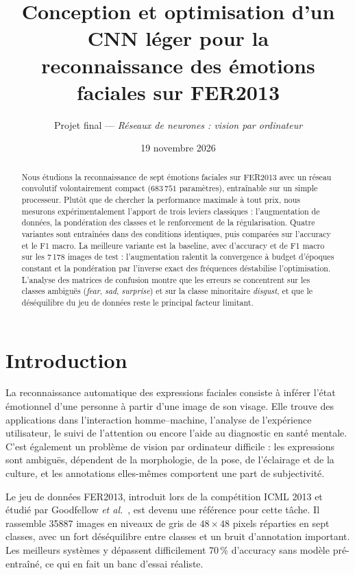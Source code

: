 \documentclass[11pt,a4paper]{article}
\title{\vspace{-1.2cm}\textbf{Conception et optimisation d'un CNN léger pour la\\reconnaissance des émotions faciales sur FER2013}}
\author{Projet final --- \emph{Réseaux de neurones : vision par ordinateur}}
\date{19 novembre 2026}
\newcommand{\NumParams}{683\,751}
\newcommand{\TestSize}{7\,178}
\begin{document}


\maketitle
\vspace{-0.8cm}

\begin{abstract}
\noindent
Nous étudions la reconnaissance de sept émotions faciales sur FER2013 avec un
réseau convolutif volontairement compact ($\NumParams$ paramètres), entraînable
sur un simple processeur. Plutôt que de chercher la performance maximale à tout
prix, nous mesurons expérimentalement l'apport de trois leviers classiques :
l'augmentation de données, la pondération des classes et le renforcement de la
régularisation. Quatre variantes sont entraînées dans des conditions
identiques, puis comparées sur l'accuracy et le F1 macro. La meilleure variante
est la baseline, avec \BestAcc{} d'accuracy et \BestF{} de F1 macro sur les
\TestSize{} images de test : l'augmentation ralentit la convergence à budget
d'époques constant et la pondération par l'inverse exact des fréquences
déstabilise l'optimisation. L'analyse des matrices de confusion montre que les
erreurs se concentrent sur les classes ambiguës (\emph{fear}, \emph{sad},
\emph{surprise}) et sur la classe minoritaire \emph{disgust}, et que le
déséquilibre du jeu de données reste le principal facteur limitant.
\end{abstract}

\section{Introduction}

La reconnaissance automatique des expressions faciales consiste à inférer
l'état émotionnel d'une personne à partir d'une image de son visage. Elle
trouve des applications dans l'interaction homme--machine, l'analyse de
l'expérience utilisateur, le suivi de l'attention ou encore l'aide au
diagnostic en santé mentale. C'est également un problème de vision par
ordinateur difficile : les expressions sont ambiguës, dépendent de la
morphologie, de la pose, de l'éclairage et de la culture, et les annotations
elles-mêmes comportent une part de subjectivité.

Le jeu de données FER2013, introduit lors de la compétition ICML 2013 et
étudié par Goodfellow \emph{et al.}~\cite{goodfellow2013}, est devenu une
référence pour cette tâche. Il rassemble \num{35887} images en niveaux de
gris de $48\times48$ pixels réparties en sept classes, avec un fort
déséquilibre entre classes et un bruit d'annotation important. Les meilleurs
systèmes y dépassent difficilement 70\,\% d'accuracy sans modèle
pré-entraîné, ce qui en fait un banc d'essai réaliste.
\end{document}

